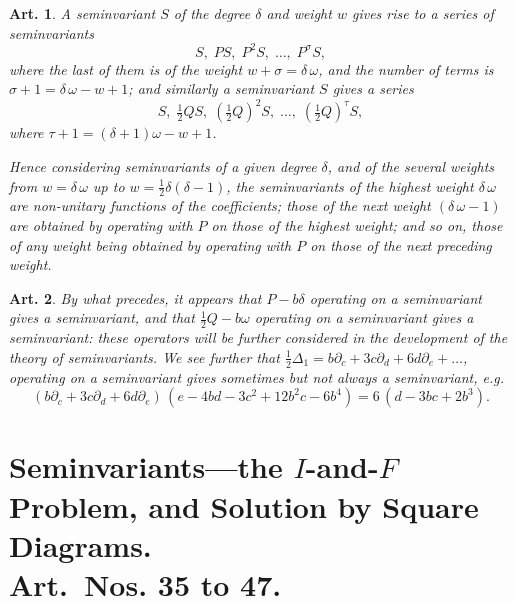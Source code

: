 \documentclass[11pt,a4paper]{article}
\theoremstyle{cayley}
\newtheorem{art}{Art.}[section]
\begin{document}
\setcounter{art}{33}
\begin{art}
A seminvariant $S$ of the degree $\delta$ and weight $w$ gives rise to a series of seminvariants
\[
S,\; PS,\; P^{2}S,\; \ldots,\; P^{\sigma}S,
\]
where the last of them is of the weight $w + \sigma = \delta\,\omega$, and the number of terms is $\sigma + 1 = \delta\,\omega - w + 1$; and similarly a seminvariant $S$ gives a series
\[
S,\; \tfrac{1}{2}QS,\; (\tfrac{1}{2}Q)^{2}S,\; \ldots,\; (\tfrac{1}{2}Q)^{\tau}S,
\]
where $\tau + 1 = (\delta + 1)\omega - w + 1$.

Hence considering seminvariants of a given degree $\delta$, and of the several weights from $w = \delta\,\omega$ up to $w = \frac{1}{2}\delta(\delta - 1)$, the seminvariants of the highest weight $\delta\,\omega$ are non-unitary functions of the coefficients; those of the next weight $(\delta\,\omega - 1)$ are obtained by operating with $P$ on those of the highest weight; and so on, those of any weight being obtained by operating with $P$ on those of the next preceding weight.
\end{art}

\setcounter{art}{34}
\begin{art}
By what precedes, it appears that $P - b\delta$ operating on a seminvariant gives a seminvariant, and that $\frac{1}{2}Q - b\omega$ operating on a seminvariant gives a seminvariant: these operators will be further considered in the development of the theory of seminvariants. We see further that $\frac{1}{2}\Delta_{1} = b\partial_{c} + 3c\partial_{d} + 6d\partial_{e} + \ldots$, operating on a seminvariant gives sometimes but not always a seminvariant, e.g.
\[
(b\partial_{c} + 3c\partial_{d} + 6d\partial_{e})\,(e - 4bd - 3c^{2} + 12b^{2}c - 6b^{4}) = 6\,(d - 3bc + 2b^{3}).
\]
\end{art}

\section*{Seminvariants---the $I$-and-$F$ Problem, and Solution by Square Diagrams.\\ Art.~Nos. \textbf{35} to \textbf{47}.}
\end{document}

